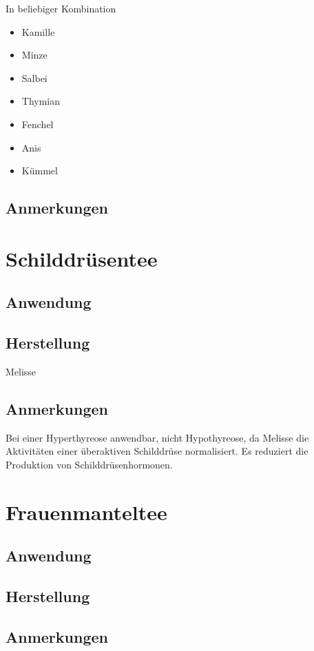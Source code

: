 In beliebiger Kombination

\begin{itemize}
	\item Kamille
	\item Minze
	\item Salbei
	\item Thymian
	\item Fenchel
	\item Anis
	\item Kümmel
\end{itemize}

\subsection{Anmerkungen}





\section{Schilddrüsentee}

\subsection{Anwendung}

\subsection{Herstellung}

Melisse

\subsection{Anmerkungen}

Bei einer Hyperthyreose anwendbar, nicht Hypothyreose, da Melisse die Aktivitäten einer überaktiven Schilddrüse normalisiert. Es reduziert die Produktion von Schilddrüsenhormonen.






\section{Frauenmanteltee}

\subsection{Anwendung}

\subsection{Herstellung}

\subsection{Anmerkungen}



